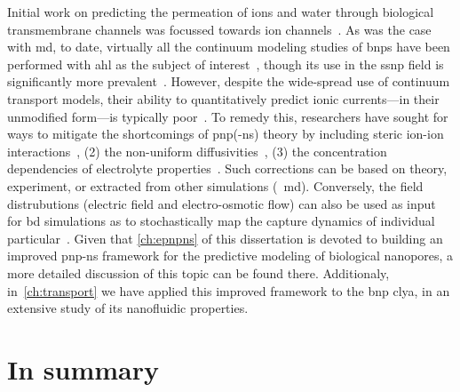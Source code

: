 Initial work on predicting the permeation of ions and water through biological transmembrane channels was
focussed towards ion channels~\cite{Eisenberg-1996,Chen-1997,Corry-2003}. As was the case with \gls{md}, to
date, virtually all the continuum modeling studies of \glspl{bnp} have been performed with \gls{ahl} as the
subject of
interest~\cite{Noskov-2004,Cozmuta-2005,OKeeffe-2007,Simakov-2010,Pederson-2015,Simakov-2018,Aguilella-Arzo-2020},
though its use in the \gls{ssnp} field is significantly more
prevalent~\cite{Daiguji-2004,Cervera-2005,White-2008,Lu-2012,Chaudhry-2014,Laohakunakorn-2015,Hulings-2018,Rigo-2019,Melnikov-2020}.
However, despite the wide-spread use of continuum transport models, their ability to quantitatively predict
ionic currents---in their unmodified form---is typically poor~\cite{Corry-2000,Collins-2012}. To remedy this,
researchers have sought for ways to mitigate the shortcomings of \gls{pnp}(-\gls{ns}) theory by including
steric ion-ion interactions~\cite{Kilic-2007,Lu-2011,Liu-2020}, (2) the non-uniform
diffusivities~\cite{Cozmuta-2005,Furini-2006,Simakov-2010,}, (3) the concentration dependencies of electrolyte
properties~\cite{Baldessari-2008-1,Burger-2012,Chen-2016}. Such corrections can be based on theory,
experiment, or extracted from other simulations (\eg~\gls{md}). Conversely, the field distrubutions (electric
field and electro-osmotic flow) can also be used as input for \gls{bd} simulations as to stochastically map
the capture dynamics of individual particular~\cite{Pederson-2015,Hulings-2018}. Given that \cref{ch:epnpns}
of this dissertation is devoted to building an improved \gls{pnp-ns} framework for the predictive modeling of
biological nanopores, a more detailed discussion of this topic can be found there. Additionaly,
in~\cref{ch:transport} we have applied this improved framework to the \gls{bnp} \gls{clya}, in an extensive
study of its nanofluidic properties.



\section{In summary}
%

